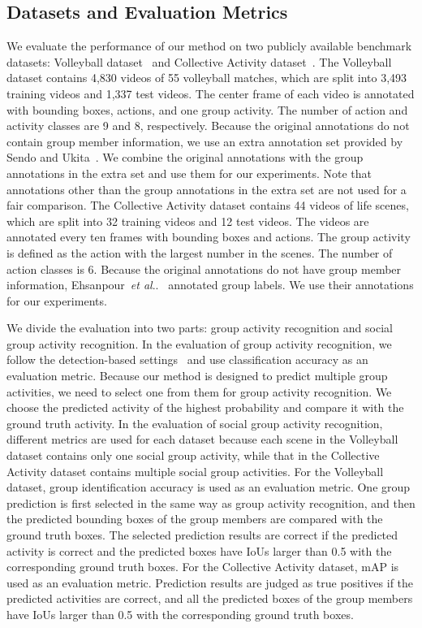 \documentclass[runningheads]{llncs}
\makeatletter
\DeclareRobustCommand\onedot{\futurelet\@let@token\@onedot}
\def\@onedot{\ifx\@let@token.\else.\null\fi\xspace}
\def\etal{\emph{et al}\onedot}
\makeatother
\begin{document}
\subsection{Datasets and Evaluation Metrics}\label{subsec:dataset}
We evaluate the performance of our method on two publicly available benchmark datasets: Volleyball dataset~\cite{ibrahim_cvpr2016} and Collective Activity dataset~\cite{choi_iccvw2009}.
The Volleyball dataset contains 4,830 videos of 55 volleyball matches, which are split into 3,493 training videos and 1,337 test videos. The center frame of each video is annotated with bounding boxes, actions, and one group activity. The number of action and activity classes are 9 and 8, respectively. Because the original annotations do not contain group member information, we use an  extra annotation set provided by Sendo and Ukita~\cite{sendo_mva2019}. We combine the original annotations with the group annotations in the extra set  and use them for our experiments. Note that annotations other than the group annotations in the extra set are not used for a fair comparison.
The Collective Activity dataset contains 44 videos of life scenes, which are split into 32 training videos and 12 test videos. The videos are annotated every ten frames with bounding boxes and actions. The group activity is defined as the action with the largest number in the scenes. The number of action classes is 6. Because the original annotations do not have group member information, Ehsanpour~\etal~\cite{ehsanpour_eccv2020} annotated group labels. We use their annotations for our experiments.

We divide the evaluation into two parts: group activity recognition and social group activity recognition.
In the evaluation of group activity recognition, we follow the detection-based settings~\cite{bagautdinov_cvpr2017,qi_eccv2018,wu_cvpr2019,ehsanpour_eccv2020} and use classification accuracy as an evaluation metric. Because our method is designed to predict multiple group activities, we need to select one from them for group activity recognition. We choose the predicted activity of the highest probability and compare it with the ground truth activity.
In the evaluation of social group activity recognition, different metrics are used for each dataset because each scene in the Volleyball dataset contains only one social group activity, while that in the Collective Activity dataset contains multiple social group activities. For the Volleyball dataset, group identification accuracy is used as an evaluation metric. One group prediction is first selected in the same way as group activity recognition, and then the predicted bounding boxes of the group members are compared with the ground truth boxes. The selected prediction results are correct if the predicted activity is correct and the predicted boxes have IoUs larger than 0.5 with the corresponding ground truth boxes. For the Collective Activity dataset, mAP is used as an evaluation metric. Prediction results are judged as true positives if the predicted activities are correct, and all the predicted boxes of the group members have IoUs larger than 0.5 with the corresponding ground truth boxes.
\end{document}
